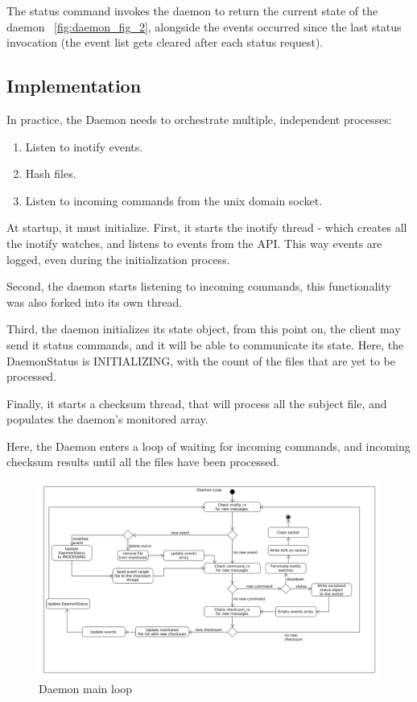 The status command invokes the daemon to return the current state of the daemon ~\ref{fig:daemon_fig_2}, alongside the events occurred since the
last status invocation (the event list gets cleared after each status request).

\subsection{Implementation}
In practice, the Daemon needs to orchestrate  multiple, independent
processes:

\begin{enumerate}
    \item Listen to inotify events.
    \item Hash files.
    \item Listen to incoming commands from the unix domain socket.
\end{enumerate}

At startup, it must initialize.
First, it starts the inotify thread - which creates all the
inotify watches, and listens to events from the API\@.
This way events are logged, even during the initialization process.

Second, the daemon starts listening to incoming commands, this functionality was also
forked into its own thread.

Third, the daemon initializes its state object, from this point on,
the client may send it status commands, and it will be able to communicate its state.
Here, the DaemonStatus is INITIALIZING, with the count of the files that are yet to be
processed.

Finally, it starts a checksum thread, that will process all the subject file,
and populates the daemon's monitored array.

Here, the Daemon enters a loop of waiting for incoming commands, and incoming
checksum results until all the files have been processed.

\begin{figure}[h]
    \centering
    \includegraphics[width=12cm]{figures/daemon/daemon_loop}
    \caption{Daemon main loop}
    \label{fig:daemon_fig_3}
\end{figure}

